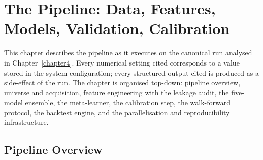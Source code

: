 \chapter{The Pipeline: Data, Features, Models, Validation, Calibration} \label{chapter3}

This chapter describes the pipeline as it executes on the canonical run analysed in Chapter~\ref{chapter4}. Every numerical setting cited corresponds to a value stored in the system configuration; every structured output cited is produced as a side-effect of the run. The chapter is organised top-down: pipeline overview, universe and acquisition, feature engineering with the leakage audit, the five-model ensemble, the meta-learner, the calibration step, the walk-forward protocol, the backtest engine, and the parallelisation and reproducibility infrastructure.

\section{Pipeline Overview}

